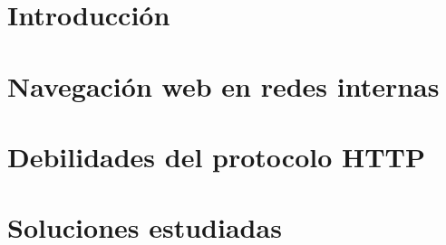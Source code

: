 \documentclass[12pt,twoside]{book}
\begin{document}
\nocite{*}

\frontmatter\pagestyle{empty}

\begin{titlepage}

\end{titlepage}




\tableofcontents

\mainmatter\pagestyle{headings}


\chapter{Introducción}
    \label{capIntro}



\chapter{Navegación web en redes internas} 
    \label{capImp}



\chapter{Debilidades del protocolo HTTP} 
    \label{capDesc}



\chapter{Soluciones estudiadas}
    \label{capVirtu}




%



%


%


%
\end{document}
